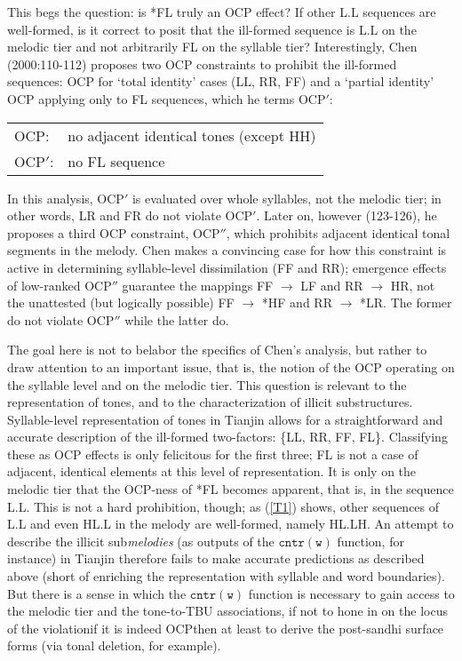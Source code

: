 \documentclass{article}
\newcommand{\C}{$\mathtt{cntr(w)}$ }
\begin{document}
This begs the question: is *FL truly an OCP effect? If other L.L sequences are well-formed, is it correct to posit that the ill-formed sequence is L.L on the melodic tier and not arbitrarily FL on the syllable tier? Interestingly, Chen (2000:110-112) proposes two OCP constraints to prohibit the ill-formed sequences: OCP for `total identity' cases (LL, RR, FF) and a `partial identity' OCP applying only to FL sequences, which he terms OCP$'$:
\begin{exe}
\ex
\begin{tabular}[t]{ll}
OCP: & no adjacent identical tones (except HH) \\
OCP$'$: & no FL sequence \\
\end{tabular}
\end{exe}
In this analysis, OCP$'$ is evaluated over whole syllables, not the melodic tier; in other words, LR and FR do not violate OCP$'$. Later on, however (123-126), he proposes a third OCP constraint, OCP$''$, which prohibits adjacent identical tonal segments in the melody. Chen makes a convincing case for how this constraint is active in determining syllable-level dissimilation (FF and RR); emergence effects of low-ranked OCP$''$ guarantee the mappings FF $\rightarrow$ LF and RR $\rightarrow$ HR, not the unattested (but logically possible) FF $\rightarrow$ *HF and RR $\rightarrow$ *LR. The former do not violate OCP$''$ while the latter do.  \par
The goal here is not to belabor the specifics of Chen's analysis, but rather to draw attention to an important issue, that is, the notion of the OCP operating on the syllable level and on the melodic tier. This question is relevant to the representation of tones, and to the characterization of illicit substructures. Syllable-level representation of tones in Tianjin allows for a straightforward and accurate description of the ill-formed two-factors: \{LL, RR, FF, FL\}. Classifying these as OCP effects is only felicitous for the first three; FL is not a case of adjacent, identical elements at this level of representation. It is only on the melodic tier that the OCP-ness of *FL becomes apparent, that is, in the sequence L.L. This is not a hard prohibition, though; as (\ref{T1}) shows, other sequences of L.L and even HL.L in the melody are well-formed, namely HL.LH. An attempt to describe the illicit sub\emph{melodies} (as outputs of the \C function, for instance) in Tianjin therefore fails to make accurate predictions as described above (short of enriching the representation with syllable and word boundaries). But there is a sense in which the \C function is necessary to gain access to the melodic tier and the tone-to-TBU associations, if not to hone in on the locus of the violation\textemdash if it is indeed OCP\textemdash then at least to derive the post-sandhi surface forms (via tonal deletion, for example). \par
\end{document}
